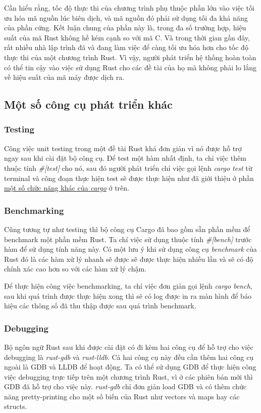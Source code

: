 Cần hiểu rằng, tốc độ thực thi của chương trình phụ thuộc phần lớn vào việc tối ưu hóa mã nguồn lúc biên dịch, và mã nguồn đó phải sử dụng tối đa khả năng của phần cứng.
Kết luận chung của phần này là, trong đa số trường hợp, hiệu suất của mã Rust không hề kém cạnh so với mã C.
Và trong thời gian gần đây, rất nhiều nhà lập trình đã và đang làm việc để càng tối ưu hóa hơn cho tốc độ thực thi của một chương trình Rust.
Vì vậy, người phát triển hệ thống hoàn toàn có thể tin cậy vào việc sử dụng Rust cho các đề tài của họ mà không phải lo lắng về hiệu suất của mã máy được dịch ra.

\subsection{Một số công cụ phát triển khác}
\subsubsection{Testing}
Công việc unit testing trong một đề tài Rust khá đơn giản vì nó được hỗ trợ ngay sau khi cài đặt bộ công cụ.
Để test một hàm nhất định, ta chỉ việc thêm thuộc tính \emph{\#[test]} cho nó, sau đó người phát triển chỉ việc gọi lệnh \emph{cargo test} từ terminal và công đoạn thực hiện test sẽ được thực hiện như đã giới thiệu ở phần \hyperref[lbl:cargo_other_features]{một số chức năng khác của \emph{cargo}} ở trên.
\subsubsection{Benchmarking}
Cũng tương tự như testing thì bộ công cụ Cargo đã bao gồm sẵn phần mềm để benchmark một phần mềm Rust.
Ta chí việc sử dụng thuộc tính \emph{\#[bench]} trước hàm để sử dụng tính năng này.
Có một lưu ý khi sử dụng công cụ \emph{benchmark} của Rust đó là các hàm xử lý nhanh sẽ được sẽ được thực hiện nhiều lần và sẽ có độ chính xác cao hơn so với các hàm xử lý chậm.

Để thực hiện công việc benchmarking, ta chỉ việc đơn giản gọi lệnh \emph{cargo bench}, sau khi quá trình được thực hiện xong thì sẽ có log được in ra màn hình để báo hiệu các thông số đã thu thập được sau quá trình benchmark.
\subsubsection{Debugging}
Bộ ngôn ngữ Rust sau khi được cài đặt có đi kèm hai công cụ để hỗ trợ cho việc debugging là \emph{rust-gdb} và \emph{rust-lldb}.
Cả hai công cụ này đều cần thêm hai công cụ ngoài là GDB và LLDB để hoạt động.
Ta có thể sử dụng GDB để thực hiện công việc debugging trực tiếp trên một chương trình Rust, vì ở các phiên bản mới thì GDB đã hỗ trợ cho việc này.
\emph{rust-gdb} chỉ đơn giản load GDB và có thêm chức năng pretty-printing cho một số biến của Rust như vectors và maps hay các structs.

